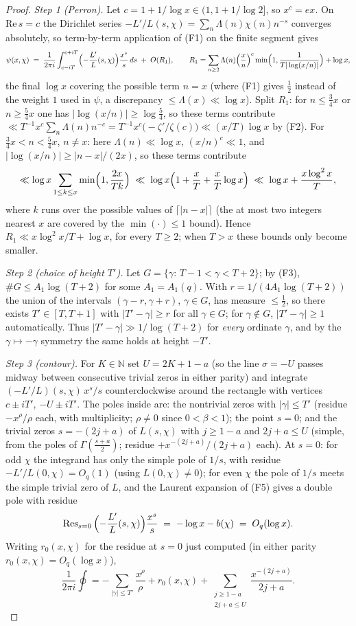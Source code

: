 \documentclass[11pt]{article}
\begin{document}
\begin{proof}
\emph{Step 1 (Perron).} Let $c=1+1/\log x\in(1,1+1/\log2]$, so
$x^c=ex$. On $\mathrm{Re}\,s=c$ the Dirichlet series
$-L'/L(s,\chi)=\sum_n\Lambda(n)\chi(n)n^{-s}$ converges absolutely, so
term-by-term application of (F1) on the finite segment gives
\[
\psi(x,\chi)\;=\;\frac{1}{2\pi i}\int_{c-iT}^{c+iT}
\Bigl(-\frac{L'}{L}(s,\chi)\Bigr)\frac{x^s}{s}\,ds\;+\;O(R_1),
\qquad
R_1=\sum_{n\ge2}\Lambda(n)\Bigl(\frac xn\Bigr)^{c}
\min\Bigl(1,\frac{1}{T|\log(x/n)|}\Bigr)+\log x,
\]
the final $\log x$ covering the possible term $n=x$ (where (F1) gives
$\tfrac12$ instead of the weight $1$ used in $\psi$, a discrepancy
$\le\Lambda(x)\ll\log x$). Split $R_1$:
for $n\le\tfrac34x$ or $n\ge\tfrac54x$ one has $|\log(x/n)|\ge
\log\tfrac54$, so these terms contribute
$\ll T^{-1}x^{c}\sum_n\Lambda(n)n^{-c}
=T^{-1}x^{c}\bigl(-\zeta'/\zeta(c)\bigr)\ll(x/T)\log x$ by (F2). For
$\tfrac34x<n<\tfrac54x$, $n\ne x$: here $\Lambda(n)\ll\log x$,
$(x/n)^c\ll1$, and $|\log(x/n)|\ge|n-x|/(2x)$, so these terms
contribute
\[
\ll\log x\sum_{1\le k\le x}\min\Bigl(1,\frac{2x}{Tk}\Bigr)
\;\ll\;\log x\Bigl(1+\frac xT+\frac xT\log x\Bigr)
\;\ll\;\log x+\frac{x\log^2x}{T},
\]
where $k$ runs over the possible values of $\lceil|n-x|\rceil$ (the at
most two integers nearest $x$ are covered by the $\min(\cdot)\le1$
bound). Hence $R_1\ll x\log^2x/T+\log x$, for every $T\ge2$; when $T>x$
these bounds only become smaller.

\emph{Step 2 (choice of height $T'$).} Let
$G=\{\gamma:\,T-1<\gamma<T+2\}$; by (F3), $\#G\le A_1\log(T+2)$ for
some $A_1=A_1(q)$. With $r=1/(4A_1\log(T+2))$ the union of the
intervals
$(\gamma-r,\gamma+r)$, $\gamma\in G$, has measure $\le\tfrac12$, so
there exists $T'\in[T,T+1]$ with $|T'-\gamma|\ge r$ for all
$\gamma\in G$; for $\gamma\notin G$, $|T'-\gamma|\ge1$ automatically.
Thus $|T'-\gamma|\gg1/\log(T+2)$ for \emph{every} ordinate $\gamma$,
and by the $\gamma\mapsto-\gamma$ symmetry the same holds at height
$-T'$.

\emph{Step 3 (contour).} For $K\in\mathbb N$ set $U=2K+1-a$ (so the
line $\sigma=-U$ passes midway between consecutive trivial zeros in
either parity) and integrate
$(-L'/L)(s,\chi)\,x^s/s$ counterclockwise around the rectangle with
vertices $c\pm iT'$, $-U\pm iT'$. The poles inside are: the nontrivial
zeros with $|\gamma|\le T'$ (residue $-x^\rho/\rho$ each, with
multiplicity; $\rho\ne0$ since $0<\beta<1$); the point $s=0$; and the
trivial zeros $s=-(2j+a)$ of $L(s,\chi)$ with $j\ge1-a$ and
$2j+a\le U$ (simple, from the poles of $\Gamma(\tfrac{s+a}2)$; residue
$+x^{-(2j+a)}/(2j+a)$ each). At $s=0$: for odd $\chi$ the integrand
has only the simple pole of $1/s$, with residue
$-L'/L(0,\chi)=O_q(1)$ (using $L(0,\chi)\ne0$); for even $\chi$ the
pole of $1/s$ meets the simple trivial zero of $L$, and the Laurent
expansion of (F5) gives a double pole with residue
\[
\mathrm{Res}_{s=0}\,\Bigl(-\frac{L'}{L}(s,\chi)\Bigr)\frac{x^s}{s}
\;=\;-\log x-b(\chi)\;=\;O_q(\log x).
\]
Writing $r_0(x,\chi)$ for the residue at $s=0$ just computed (in
either parity $r_0(x,\chi)=O_q(\log x)$),
\[
\frac{1}{2\pi i}\oint
=-\sum_{|\gamma|\le T'}\frac{x^\rho}{\rho}+r_0(x,\chi)
+\sum_{\substack{j\ge1-a\\ 2j+a\le U}}\frac{x^{-(2j+a)}}{2j+a}.
\]


\end{proof}
\end{document}
